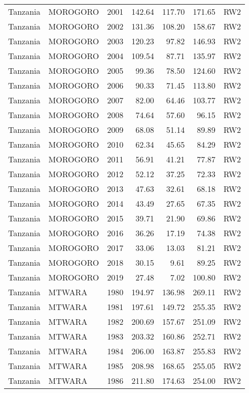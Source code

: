 \begin{longtable}{lllrrrl}
  Tanzania & MOROGORO & 2001 & 142.64 & 117.70 & 171.65 & RW2 \\ 
  Tanzania & MOROGORO & 2002 & 131.36 & 108.20 & 158.67 & RW2 \\ 
  Tanzania & MOROGORO & 2003 & 120.23 & 97.82 & 146.93 & RW2 \\ 
  Tanzania & MOROGORO & 2004 & 109.54 & 87.71 & 135.97 & RW2 \\ 
  Tanzania & MOROGORO & 2005 & 99.36 & 78.50 & 124.60 & RW2 \\ 
  Tanzania & MOROGORO & 2006 & 90.33 & 71.45 & 113.80 & RW2 \\ 
  Tanzania & MOROGORO & 2007 & 82.00 & 64.46 & 103.77 & RW2 \\ 
  Tanzania & MOROGORO & 2008 & 74.64 & 57.60 & 96.15 & RW2 \\ 
  Tanzania & MOROGORO & 2009 & 68.08 & 51.14 & 89.89 & RW2 \\ 
  Tanzania & MOROGORO & 2010 & 62.34 & 45.65 & 84.29 & RW2 \\ 
  Tanzania & MOROGORO & 2011 & 56.91 & 41.21 & 77.87 & RW2 \\ 
  Tanzania & MOROGORO & 2012 & 52.12 & 37.25 & 72.33 & RW2 \\ 
  Tanzania & MOROGORO & 2013 & 47.63 & 32.61 & 68.18 & RW2 \\ 
  Tanzania & MOROGORO & 2014 & 43.49 & 27.65 & 67.35 & RW2 \\ 
  Tanzania & MOROGORO & 2015 & 39.71 & 21.90 & 69.86 & RW2 \\ 
  Tanzania & MOROGORO & 2016 & 36.26 & 17.19 & 74.38 & RW2 \\ 
  Tanzania & MOROGORO & 2017 & 33.06 & 13.03 & 81.21 & RW2 \\ 
  Tanzania & MOROGORO & 2018 & 30.15 & 9.61 & 89.25 & RW2 \\ 
  Tanzania & MOROGORO & 2019 & 27.48 & 7.02 & 100.80 & RW2 \\ 
  Tanzania & MTWARA & 1980 & 194.97 & 136.98 & 269.11 & RW2 \\ 
  Tanzania & MTWARA & 1981 & 197.61 & 149.72 & 255.35 & RW2 \\ 
  Tanzania & MTWARA & 1982 & 200.69 & 157.67 & 251.09 & RW2 \\ 
  Tanzania & MTWARA & 1983 & 203.32 & 160.86 & 252.71 & RW2 \\ 
  Tanzania & MTWARA & 1984 & 206.00 & 163.87 & 255.83 & RW2 \\ 
  Tanzania & MTWARA & 1985 & 208.98 & 168.65 & 255.05 & RW2 \\ 
  Tanzania & MTWARA & 1986 & 211.80 & 174.63 & 254.00 & RW2 \\ 

\end{longtable}
